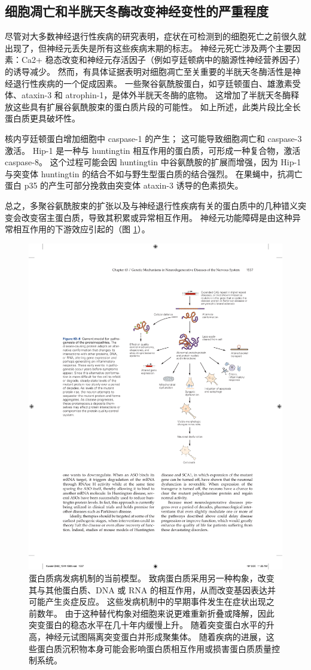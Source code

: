 \subsection{细胞凋亡和半胱天冬酶改变神经变性的严重程度}

尽管对大多数神经退行性疾病的研究表明，症状在可检测到的细胞死亡之前很久就出现了，但神经元丢失是所有这些疾病末期的标志。 神经元死亡涉及两个主要因素：Ca2+ 稳态改变和神经元存活因子（例如亨廷顿病中的脑源性神经营养因子）的诱导减少。 然而，有具体证据表明对细胞凋亡至关重要的半胱天冬酶活性是神经退行性疾病的一个促成因素。 一些聚谷氨酰胺蛋白，如亨廷顿蛋白、雄激素受体、ataxin-3 和 atrophin-1，是体外半胱天冬酶的底物。 这增加了半胱天冬酶释放这些具有扩展谷氨酰胺束的蛋白质片段的可能性。 如上所述，此类片段比全长蛋白质更具破坏性。

核内亨廷顿蛋白增加细胞中 caspase-1 的产生； 这可能导致细胞凋亡和 caspase-3 激活。 Hip-1 是一种与 huntingtin 相互作用的蛋白质，可形成一种复合物，激活 caspase-8。 这个过程可能会因 huntingtin 中谷氨酰胺的扩展而增强，因为 Hip-1 与突变体 huntingtin 的结合不如与野生型蛋白质的结合强烈。 在果蝇中，抗凋亡蛋白 p35 的产生可部分挽救由突变体 ataxin-3 诱导的色素损失。

总之，多聚谷氨酰胺束的扩张以及与神经退行性疾病有关的蛋白质中的几种错义突变会改变宿主蛋白质，导致其积累或异常相互作用。 神经元功能障碍是由这种异常相互作用的下游效应引起的（图 \ref{fig:63_6}）。

\begin{figure}[htbp]
	\centering
	\includegraphics[width=0.7\linewidth]{chap63/fig_63_6}
	\caption{蛋白质病发病机制的当前模型。 致病蛋白质采用另一种构象，改变其与其他蛋白质、DNA 或 RNA 的相互作用，从而改变基因表达并可能产生炎症反应。 这些发病机制中的早期事件发生在症状出现之前数年。 由于这种替代构象对细胞来说更难重新折叠或降解，因此突变蛋白的稳态水平在几十年内缓慢上升。 随着突变蛋白水平的升高，神经元试图隔离突变蛋白并形成聚集体。 随着疾病的进展，这些蛋白质沉积物本身可能会影响蛋白质相互作用或损害蛋白质质量控制系统。}
	\label{fig:63_6}
\end{figure}

